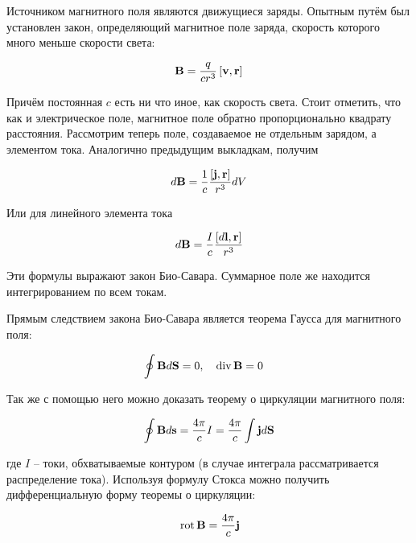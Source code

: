 Источником магнитного поля являются движущиеся заряды. Опытным путём был установлен закон, определяющий магнитное поле заряда, скорость которого много меньше скорости света:

\begin{equation}
    \mathbf B = \frac{q}{c r^3} \left[ \mathbf v, \mathbf r \right]
\end{equation}

\noindent
Причём постоянная $c$ есть ни что иное, как скорость света. Стоит отметить, что как и электрическое поле, магнитное поле обратно пропорционально квадрату расстояния. Рассмотрим теперь поле, создаваемое не отдельным зарядом, а элементом тока. Аналогично предыдущим выкладкам, получим

\begin{equation}
    d \mathbf B = \frac{1}{c} \frac{\left[ \mathbf j, \mathbf r \right]}{r^3} dV
\end{equation}

\noindent
Или для линейного элемента тока

\begin{equation}
    d \mathbf B = \frac{I}{c} \frac{\left[ d \mathbf l, \mathbf r \right]}{r^3}
\end{equation}

\noindent
Эти формулы выражают закон Био-Савара. Суммарное поле же находится интегрированием по всем токам.

Прямым следствием закона Био-Савара является теорема Гаусса для магнитного поля:

\begin{align}
    \oint \mathbf B d \mathbf S &= 0, & \, \text{div} \, \mathbf B &= 0
\end{align}

Так же с помощью него можно доказать теорему о циркуляции магнитного поля:

\begin{equation}
    \oint \mathbf B d \mathbf s = \frac{4 \pi}{c} I = \frac{4 \pi}{c} \int \mathbf j d \mathbf S
\end{equation}

\noindent
где $I$ -- токи, обхватываемые контуром (в случае интеграла рассматривается распределение тока). Используя формулу Стокса можно получить дифференциальную форму теоремы о циркуляции:

\begin{equation}
    \, \text{rot} \, \mathbf B = \frac{4 \pi}{c} \mathbf j
\end{equation}